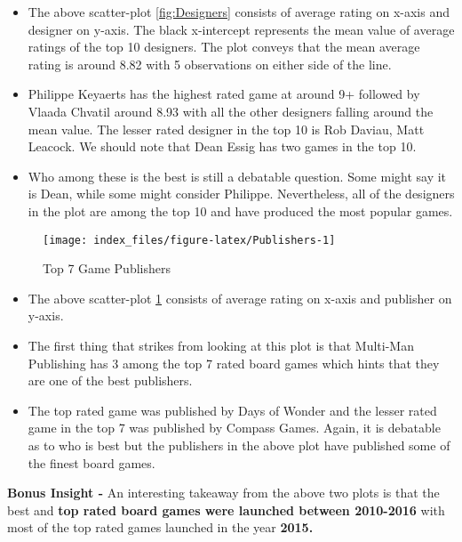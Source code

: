 \documentclass[
]{article}
\begin{document}
\begin{itemize}
\item
  The above scatter-plot \ref{fig:Designers} consists of average rating on x-axis and designer on y-axis. The black x-intercept represents the mean value of average ratings of the top 10 designers. The plot conveys that the mean average rating is around 8.82 with 5 observations on either side of the line.
\item
  Philippe Keyaerts has the highest rated game at around 9+ followed by Vlaada Chvatil around 8.93 with all the other designers falling around the mean value. The lesser rated designer in the top 10 is Rob Daviau, Matt Leacock. We should note that Dean Essig has two games in the top 10.
\item
  Who among these is the best is still a debatable question. Some might say it is Dean, while some might consider Philippe. Nevertheless, all of the designers in the plot are among the top 10 and have produced the most popular games.
\end{itemize}

\begin{figure}[H]

{\centering \texttt{[image: index\_files/figure-latex/Publishers-1]} 

}

\caption{Top 7 Game Publishers}\label{fig:Publishers}
\end{figure}

\begin{itemize}
\item
  The above scatter-plot \ref{fig:Publishers} consists of average rating on x-axis and publisher on y-axis.
\item
  The first thing that strikes from looking at this plot is that Multi-Man Publishing has 3 among the top 7 rated board games which hints that they are one of the best publishers.
\item
  The top rated game was published by Days of Wonder and the lesser rated game in the top 7 was published by Compass Games. Again, it is debatable as to who is best but the publishers in the above plot have published some of the finest board games.
\end{itemize}

\textbf{Bonus Insight -} An interesting takeaway from the above two plots is that the best and \textbf{top rated board games were launched between 2010-2016} with most of the top rated games launched in the year \textbf{2015.}
\end{document}
